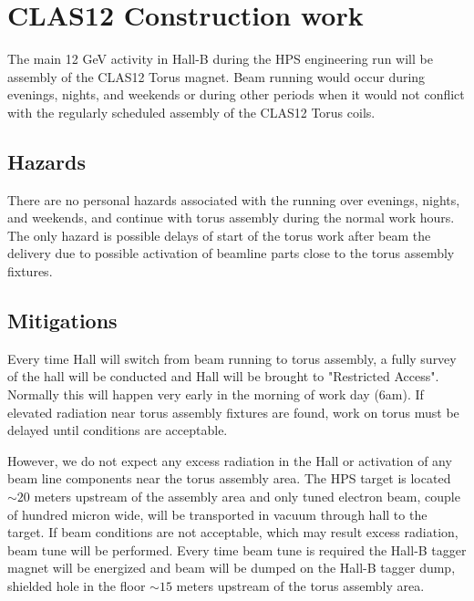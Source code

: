 \graphicspath{{hps/figs/}}
\renewcommand{\dirfig}[0]{hps/figs}
\renewcommand{\dircur}[0]{hps}







\section{CLAS12 Construction work}
\indent

The main 12 GeV activity in Hall-B during the HPS engineering run will be assembly of the CLAS12 Torus magnet. Beam running would occur during evenings, nights, and weekends or during other periods when it would not conflict with the regularly scheduled assembly of the CLAS12 Torus coils.

\subsection{Hazards} 
\indent

There are no personal hazards associated with the running over evenings, nights, and weekends, and continue with torus assembly during the normal work hours. The only hazard is possible delays of start of the torus work after beam the delivery due to possible activation of beamline parts close to the torus assembly fixtures.
 
\subsection{Mitigations}
\indent

Every time Hall will switch from beam running to torus assembly, a fully survey of the hall will be conducted and Hall will be brought to "Restricted Access". Normally this will happen very early in the morning of work day (6am). If elevated radiation near torus assembly fixtures are found, work on torus must be delayed until conditions are acceptable. 

However, we do not expect any excess radiation in the Hall or activation of any beam line components near the torus assembly area. The HPS  target is located $\sim20$ meters upstream of the assembly area and only tuned electron beam, couple of hundred micron wide, will be transported in vacuum through hall to the target. If beam conditions are not acceptable, which may result excess radiation, beam tune will be performed. Every time beam tune is required the Hall-B tagger magnet will be energized and beam will be dumped on the Hall-B tagger dump, shielded hole in the floor $\sim 15$ meters upstream of the torus assembly area. 

